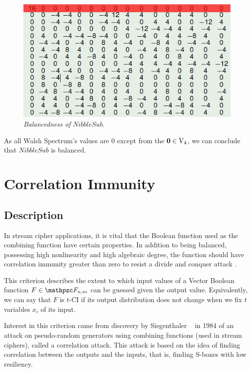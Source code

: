 \begin{example}
\begin{figure}[htbp!]
\centering
\includegraphics{bal}
\caption[Balancedness of NibbleSub]{\textit{Balancedness of }$NibbleSub$.}
\label{fig:bal}
\end{figure}

As all Walsh Spectrum's values are 0 except from the $\vec{0} \in \gf{V_4}$, we can conclude that $NibbleSub$ is balanced.
\end{example}

\section{Correlation Immunity}

\subsection{Description}

In stream cipher applications, it is vital that the Boolean function used as the combining function have certain properties. In addition to being balanced, possessing high nonlinearity and high algebraic degree, the function should have correlation immunity greater than zero to resist a divide and conquer attack \cite{Siegenthaler:84}.

This criterion describes the extent to which input values of a Vector Boolean function $F \in \funct{F}_{n,m}$ can be guessed given the output value. Equivalently, we can say that $F$ is $t$-CI if its output distribution does not change when we fix $t$ variables $x_i$ of its input.

Interest in this criterion came from discovery by Siegenthaler ~\cite{Siegenthaler:84} in 1984 of an attack on pseudo-random generators using combining functions (used in stream ciphers), called a correlation attack. This attack is based on the idea of finding correlation between the outputs and the inputs, that is, finding S-boxes with low resiliency.

